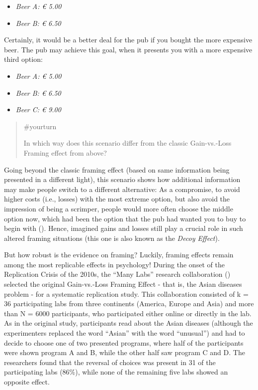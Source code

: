 \documentclass[
  letterpaper,
]{book}
\providecommand{\tightlist}{%
  \setlength{\itemsep}{0pt}\setlength{\parskip}{0pt}}\usepackage{longtable,booktabs,array}
\begin{document}
\begin{itemize}
\tightlist
\item
  \emph{Beer A: € 5.00}
\item
  \emph{Beer B: € 6.50}
\end{itemize}

Certainly, it would be a better deal for the pub if you bought the more
expensive beer. The pub may achieve this goal, when it presents you with
a more expensive third option:

\begin{itemize}
\tightlist
\item
  \emph{Beer A: € 5.00}
\item
  \emph{Beer B: € 6.50}
\item
  \emph{Beer C: € 9.00}
\end{itemize}

\begin{quote}
{\#yourturn}

In which way does this scenario differ from the classic Gain-vs.-Loss
Framing effect from above?
\end{quote}

Going beyond the classic framing effect (based on same information being
presented in a different light), this scenario shows how additional
information may make people switch to a different alternative: As a
compromise, to avoid higher costs (i.e., losses) with the most extreme
option, but also avoid the impression of being a scrimper, people would
more often choose the middle option now, which had been the option that
the pub had wanted you to buy to begin with
(). Hence,
imagined gains and losses still play a crucial role in such altered
framing situations (this one is also known as the \emph{Decoy Effect}).

But how robust is the evidence on framing? Luckily, framing effects
remain among the most replicable effects in psychology! During the onset
of the Replication Crisis of the 2010s, the ``Many Labs'' research
collaboration () selected the original Gain-vs.-Loss Framing Effect - that is, the
Asian diseases problem - for a systematic replication study. This
collaboration consisted of k = 36 participating labs from three
continents (America, Europe and Asia) and more than N = 6000
participants, who participated either online or directly in the lab. As
in the original study, participants read about the Asian diseases
(although the experimenters replaced the word ``Asian'' with the word
``unusual'') and had to decide to choose one of two presented programs,
where half of the participants were shown program A and B, while the
other half saw program C and D. The researchers found that the reversal
of choices was present in 31 of the participating labs (86\%), while
none of the remaining five labs showed an opposite effect.
\end{document}
